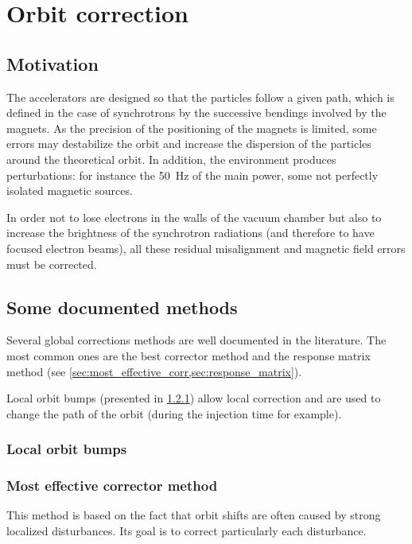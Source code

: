 
\chapter{Orbit correction}
\label{sec:correction}

\section{Motivation}
The accelerators are designed so that the particles follow a given path, which is defined in the case of synchrotrons by the successive bendings involved by the magnets. As the precision of the positioning of the magnets is limited, some errors may destabilize the orbit and increase the dispersion of the particles around the theoretical orbit. In addition, the environment produces perturbations: for instance the 50~Hz of the main power, some not perfectly isolated magnetic sources.

In order not to lose electrons in the walls of the vacuum chamber but also to increase the brightness of the synchrotron radiations (and therefore to have focused electron beams), all these residual misalignment and magnetic field errors must be corrected.

\section{Some documented methods}
Several global corrections methods are well documented in the literature. The most common ones are the best corrector method and the response matrix method (see \cref{sec:most_effective_corr,sec:response_matrix}). 

Local orbit bumps (presented in \cref{sec:orbit_bump}) allow local correction and are used to change the path of the orbit (during the injection time for example).

\subsection{Local orbit bumps}
\label{sec:orbit_bump}

\subsection{Most effective corrector method}
\label{sec:most_effective_corr}
This method is based on the fact that orbit shifts are often caused by strong localized disturbances. Its goal is to correct particularly each disturbance.

